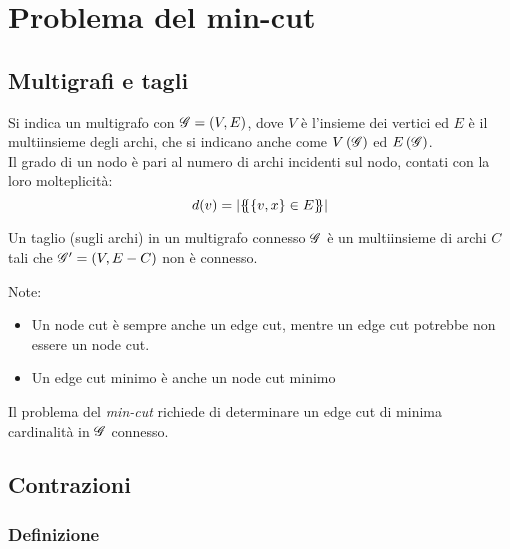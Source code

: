 \section{Problema del min-cut}

\subsection{Multigrafi e tagli}

Si indica un multigrafo con $
\mathscr{G}{}
=
\left( V, E \right)
$, dove $V$ è l'insieme dei vertici ed $E$ è il multiinsieme degli archi,
che si indicano anche come $
V \left( \mathscr{G}{} \right)
$ ed $
E \left( \mathscr{G}{} \right)
$.
\\
Il grado di un nodo è pari al numero di archi incidenti sul nodo, contati con la loro molteplicità:
\begin{equation*}
    d(v) =
    |
    \{\mskip-5mu\{
    \left\{ 
        v, x
    \right\}
    \in E
    \}\mskip-5mu\}
    |
\end{equation*}

\begin{definition}
    \label{def:edge_cut}
    Un taglio (sugli archi) in un multigrafo connesso $
    \mathscr{G}{}
    $ è un multiinsieme di archi $C$ tali che $
    \mathscr{G}{}' = \left( V, E-C \right)
    $ non è connesso.
\end{definition}
Note:
\begin{itemize}
    \item Un node cut è sempre anche un edge cut, mentre un edge cut potrebbe non essere un node cut.
    \item Un edge cut minimo è anche un node cut minimo
\end{itemize}

Il problema del \emph{min-cut} richiede di determinare un edge cut di minima cardinalità in $
\mathscr{G}{}
$ connesso.

\subsection{Contrazioni}

\subsubsection{Definizione}

